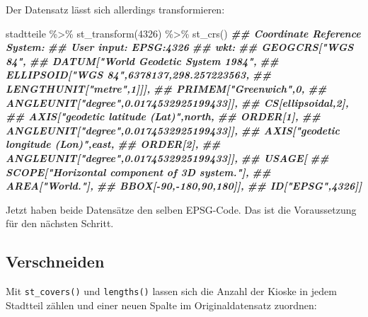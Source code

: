 \documentclass[11pt,german,a4paper]{article}
\newenvironment{Shaded}{\begin{snugshade}}{\end{snugshade}}
\newcommand{\DecValTok}[1]{\textcolor[rgb]{0.00,0.00,0.81}{#1}}
\newcommand{\DocumentationTok}[1]{\textcolor[rgb]{0.56,0.35,0.01}{\textbf{\textit{#1}}}}
\newcommand{\FunctionTok}[1]{\textcolor[rgb]{0.00,0.00,0.00}{#1}}
\newcommand{\NormalTok}[1]{#1}
\newcommand{\OtherTok}[1]{\textcolor[rgb]{0.56,0.35,0.01}{#1}}
\newcommand{\SpecialCharTok}[1]{\textcolor[rgb]{0.00,0.00,0.00}{#1}}
\begin{document}
Der Datensatz lässt sich allerdings transformieren:

\begin{Shaded}
\begin{Highlighting}[]
\NormalTok{stadtteile }\SpecialCharTok{\%\textgreater{}\%}
  \FunctionTok{st\_transform}\NormalTok{(}\DecValTok{4326}\NormalTok{) }\SpecialCharTok{\%\textgreater{}\%}
  \FunctionTok{st\_crs}\NormalTok{()}
\DocumentationTok{\#\# Coordinate Reference System:}
\DocumentationTok{\#\#   User input: EPSG:4326 }
\DocumentationTok{\#\#   wkt:}
\DocumentationTok{\#\# GEOGCRS["WGS 84",}
\DocumentationTok{\#\#     DATUM["World Geodetic System 1984",}
\DocumentationTok{\#\#         ELLIPSOID["WGS 84",6378137,298.257223563,}
\DocumentationTok{\#\#             LENGTHUNIT["metre",1]]],}
\DocumentationTok{\#\#     PRIMEM["Greenwich",0,}
\DocumentationTok{\#\#         ANGLEUNIT["degree",0.0174532925199433]],}
\DocumentationTok{\#\#     CS[ellipsoidal,2],}
\DocumentationTok{\#\#         AXIS["geodetic latitude (Lat)",north,}
\DocumentationTok{\#\#             ORDER[1],}
\DocumentationTok{\#\#             ANGLEUNIT["degree",0.0174532925199433]],}
\DocumentationTok{\#\#         AXIS["geodetic longitude (Lon)",east,}
\DocumentationTok{\#\#             ORDER[2],}
\DocumentationTok{\#\#             ANGLEUNIT["degree",0.0174532925199433]],}
\DocumentationTok{\#\#     USAGE[}
\DocumentationTok{\#\#         SCOPE["Horizontal component of 3D system."],}
\DocumentationTok{\#\#         AREA["World."],}
\DocumentationTok{\#\#         BBOX[{-}90,{-}180,90,180]],}
\DocumentationTok{\#\#     ID["EPSG",4326]]}
\end{Highlighting}
\end{Shaded}

Jetzt haben beide Datensätze den selben EPSG-Code. Das ist die Voraussetzung für den nächsten Schritt.

\hypertarget{verschneiden}{%
\subsection{Verschneiden}\label{verschneiden}}

Mit \texttt{st\_covers()} und \texttt{lengths()} lassen sich die Anzahl der Kioske in jedem Stadtteil zählen und einer neuen Spalte im Originaldatensatz zuordnen:

\begin{Shaded}
\end{Shaded}
\end{document}

